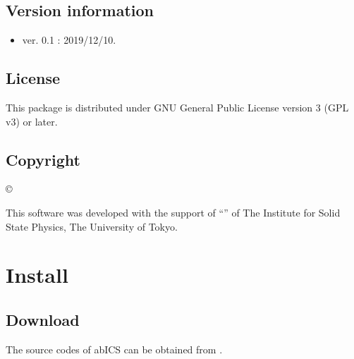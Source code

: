 \documentclass[letterpaper,10pt,english]{sphinxmanual}
\begin{document}
\section{Version information}
\label{\detokenize{about/info:version-information}}\begin{itemize}
\item {} 
ver. 0.1 : 2019/12/10.

\end{itemize}


\section{License}
\label{\detokenize{about/info:license}}
This package is distributed under GNU General Public License version 3 (GPL v3) or later.


\section{Copyright}
\label{\detokenize{about/info:copyright}}
© 

This software was developed with the support of “” of The Institute for Solid State Physics, The University of Tokyo.


\chapter{Install}
\label{\detokenize{install/index::doc}}\label{\detokenize{install/index:install}}

\section{Download}
\label{\detokenize{install/install:download}}\label{\detokenize{install/install::doc}}
The source codes of abICS can be obtained from  .

\end{document}
